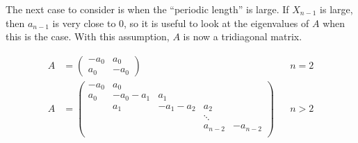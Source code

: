 \documentclass[12pt]{article}
\begin{document}
The next case to consider is when the ``periodic length'' is large. If $X_{n-1}$ is large, then $a_{n-1}$ is very close to 0, so it is useful to look at the eigenvalues of $A$ when this is the case. With this assumption, $A$ is now a tridiagonal matrix. 

\begin{align*}
A &= \begin{pmatrix}
-a_0 & a_0 \\
a_0 & -a_0 
\end{pmatrix} && n = 2 \\
A &= \begin{pmatrix}
- a_0 & a_0 & & &  \\
a_0 & -a_0 - a_1 &  a_1 \\
& a_1 & -a_1 - a_2 &  a_2 \\
& & & \ddots \\
& & & a_{n-2} & -a_{n-2} \\
\end{pmatrix} && n > 2
\end{align*}
\end{document}
